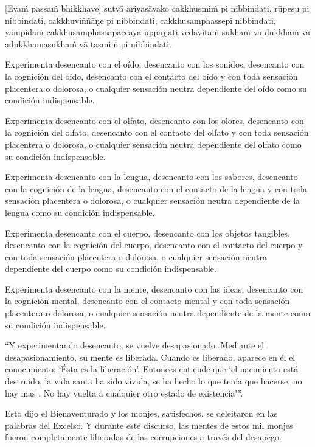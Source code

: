 [Evaṁ passaṁ bhikkhave] sutvā ariyasāvako cakkhusmiṁ pi nibbindati,
rūpesu pi nibbindati, cakkhuviññāṇe pi nibbindati, cakkhusamphassepi
nibbindati, yampidaṁ cakkhusamphassapaccayā uppajjati vedayitaṁ sukhaṁ
vā dukkhaṁ vā adukkhamasukhaṁ vā tasmiṁ pi nibbindati.

\clearpage

\englishText
\markboth{\englishTitle}{\rightmark}

Experimenta desencanto con el oído, desencanto con los sonidos, desencanto con la cognición del oído, desencanto con el contacto del oído y con toda sensación placentera o dolorosa, o cualquier sensación neutra dependiente del oído como su condición indispensable.

Experimenta desencanto con el olfato, desencanto con los olores, desencanto con la cognición del olfato, desencanto con el contacto del olfato y con toda sensación placentera o dolorosa, o cualquier sensación neutra dependiente del olfato como su condición indispensable.

Experimenta desencanto con la lengua, desencanto con los sabores, desencanto con la cognición de la lengua, desencanto con el contacto de la lengua y con toda sensación placentera o dolorosa, o cualquier sensación neutra dependiente de la lengua como su condición indispensable.

Experimenta desencanto con el cuerpo, desencanto con los objetos tangibles, desencanto con la cognición del cuerpo, desencanto con el contacto del cuerpo y con toda sensación placentera o dolorosa, o cualquier sensación neutra dependiente del cuerpo como su condición indispensable.


Experimenta desencanto con la mente, desencanto con las ideas, desencanto con la cognición mental, desencanto con el contacto mental y con toda sensación placentera o dolorosa, o cualquier sensación neutra dependiente de la mente como su condición indispensable.

“Y experimentando desencanto, se vuelve desapasionado. Mediante el desapasionamiento, su mente es liberada. Cuando es liberado, aparece en él el conocimiento: ‘Ésta es la liberación’. Entonces entiende que ‘el nacimiento está destruido, la vida santa ha sido vivida, se ha hecho lo que tenía que hacerse, no hay mas . No hay vuelta a cualquier otro estado de existencia’”.

\enlargethispage{2\baselineskip}

Esto dijo el Bienaventurado y los monjes, satisfechos, se deleitaron en las palabras del Excelso. Y durante este discurso, las mentes de estos mil monjes fueron completamente liberadas de las corrupciones a través del desapego.


